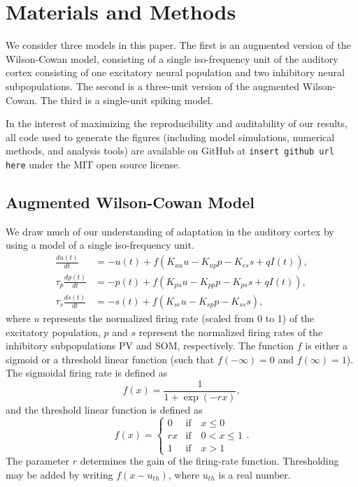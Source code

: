\documentclass[a4paper,10pt]{article}
\begin{document}

\section{Materials and Methods}

We consider three models in this paper. The first is an augmented version of the Wilson-Cowan model, consisting of a single iso-frequency unit of the auditory cortex consisting of one excitatory neural population and two inhibitory neural subpopulations. The second is a three-unit version of the augmented Wilson-Cowan. The third is a single-unit spiking model.

In the interest of maximizing the reproducibility and auditability of our results, all code used to generate the figures (including model simulations, numerical methods, and analysis tools) are available on GitHub at \texttt{insert github url here} under the MIT open source license. 

\subsection{Augmented Wilson-Cowan Model}
We draw much of our understanding of adaptation in the auditory cortex by using a model of a single iso-frequency unit.
\begin{equation}\label{eq:wc}
 \begin{split}
 \frac{d u(t)}{d t} &= -u(t) + f\left( K_{uu} u - K_{up} p - K_{es}s + q I(t) \right),\\
 \tau_p\frac{d p(t)}{d t} &= -p(t) + f\left( K_{pu} u - K_{pp}p - K_{ps}s + q I(t)\right),\\
 \tau_s\frac{d s(t)}{d t} &= -s(t) + f(K_{se}u - K_{sp}p - K_{ss}s),
 \end{split}
\end{equation}
where $u$ represents the normalized firing rate (scaled from 0 to 1) of the excitatory population, $p$ and $s$ represent the normalized firing rates of the inhibitory subpopulations PV and SOM, respectively. The function $f$ is either a sigmoid or a threshold linear function (such that $f(-\infty) = 0$ and $f(\infty)=1$). The sigmoidal firing rate is defined as
\begin{equation}\label{eq:sigmoid}
 f(x) = \frac{1}{1+\exp(-r x)},
\end{equation}
and the threshold linear function is defined as
\begin{equation}\label{eq:linear}
 f(x) = \left\{\begin{matrix}
         0 & \text{if} \quad x \leq 0\\
         r x & \text{if} \quad 0 < x \leq 1\\
         1 & \text{if} \quad x > 1
        \end{matrix}\right. .
\end{equation}
The parameter $r$ determines the gain of the firing-rate function. Thresholding may be added by writing $f(x-u_{th})$, where $u_{th}$ is a real number.
\end{document}
